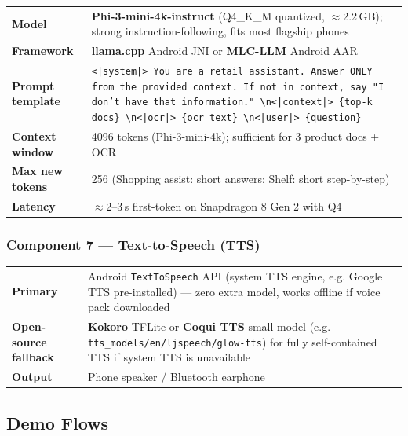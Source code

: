 \documentclass[11pt,a4paper]{article}
\begin{document}
\begin{table}[h!]
\renewcommand{\arraystretch}{1.3}
\begin{tabularx}{\textwidth}{L{3cm} X}
\toprule
\textbf{Model} & \textbf{Phi-3-mini-4k-instruct} (Q4\_K\_M quantized, $\approx$2.2\,GB); strong instruction-following, fits most flagship phones \\
\textbf{Framework} & \textbf{llama.cpp} Android JNI or \textbf{MLC-LLM} Android AAR \\
\textbf{Prompt template} &
\texttt{<|system|> You are a retail assistant. Answer ONLY from the provided context. If not in context, say "I don't have that information." \textbackslash n<|context|> \{top-k docs\} \textbackslash n<|ocr|> \{ocr text\} \textbackslash n<|user|> \{question\}} \\
\textbf{Context window} & 4096 tokens (Phi-3-mini-4k); sufficient for 3 product docs + OCR \\
\textbf{Max new tokens} & 256 (Shopping assist: short answers; Shelf: short step-by-step) \\
\textbf{Latency} & $\approx$2–3\,s first-token on Snapdragon 8 Gen 2 with Q4 \\
\bottomrule
\end{tabularx}
\end{table}

\subsubsection{Component 7 — Text-to-Speech (TTS)}

\begin{table}[h!]
\renewcommand{\arraystretch}{1.3}
\begin{tabularx}{\textwidth}{L{3cm} X}
\toprule
\textbf{Primary} & Android \texttt{TextToSpeech} API (system TTS engine, e.g. Google TTS pre-installed) — zero extra model, works offline if voice pack downloaded \\
\textbf{Open-source fallback} & \textbf{Kokoro} TFLite or \textbf{Coqui TTS} small model (e.g. \texttt{tts\_models/en/ljspeech/glow-tts}) for fully self-contained TTS if system TTS is unavailable \\
\textbf{Output} & Phone speaker / Bluetooth earphone \\
\bottomrule
\end{tabularx}
\end{table}

\subsection{Demo Flows}
\end{document}
